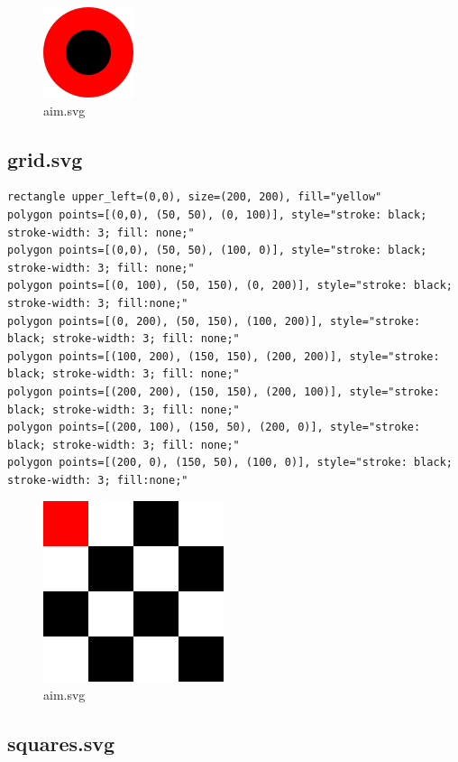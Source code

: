\documentclass{article}
\theoremstyle{definition}
\theoremstyle{remark}
\begin{document}
\begin{figure}[H]
  \centering
  \includegraphics[scale=1]{images/aim}
  \caption{aim.svg}
\end{figure}

\subsection{grid.svg}

\begin{verbatim}
rectangle upper_left=(0,0), size=(200, 200), fill="yellow"
polygon points=[(0,0), (50, 50), (0, 100)], style="stroke: black; stroke-width: 3; fill: none;"
polygon points=[(0,0), (50, 50), (100, 0)], style="stroke: black; stroke-width: 3; fill: none;"
polygon points=[(0, 100), (50, 150), (0, 200)], style="stroke: black; stroke-width: 3; fill:none;"
polygon points=[(0, 200), (50, 150), (100, 200)], style="stroke: black; stroke-width: 3; fill: none;"
polygon points=[(100, 200), (150, 150), (200, 200)], style="stroke: black; stroke-width: 3; fill: none;"
polygon points=[(200, 200), (150, 150), (200, 100)], style="stroke: black; stroke-width: 3; fill: none;"
polygon points=[(200, 100), (150, 50), (200, 0)], style="stroke: black; stroke-width: 3; fill: none;"
polygon points=[(200, 0), (150, 50), (100, 0)], style="stroke: black; stroke-width: 3; fill:none;"
\end{verbatim}

\begin{figure}[H]
  \centering
  \includegraphics[scale=0.6]{images/grid}
  \caption{aim.svg}
\end{figure}

\subsection{squares.svg}
\end{document}
